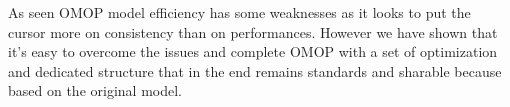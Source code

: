 As seen OMOP model efficiency has some weaknesses as it looks to put the cursor
more on consistency than on performances. However we have shown that it's easy
to overcome the issues and complete OMOP with a set of optimization and
dedicated structure that in the end remains standards and sharable because
based on the original model.

